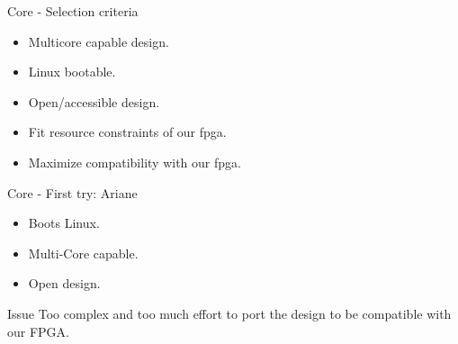\begin{frame}{Core - Selection criteria}
  \begin{itemize}
    \item Multicore capable design.
    \item Linux bootable.
    \item Open/accessible design.
    \item Fit resource constraints of our fpga. 
    \item Maximize compatibility with our fpga.
  \end{itemize}
\end{frame}

\begin{frame}{Core - First try: Ariane}
	\begin{itemize}
		\item Boots Linux.
		\item Multi-Core capable.
		\item Open design.
	\end{itemize}

	\begin{alertblock}{Issue}
		Too complex and too much effort to port the design to be compatible with our FPGA.	
	\end{alertblock}
\end{frame}

